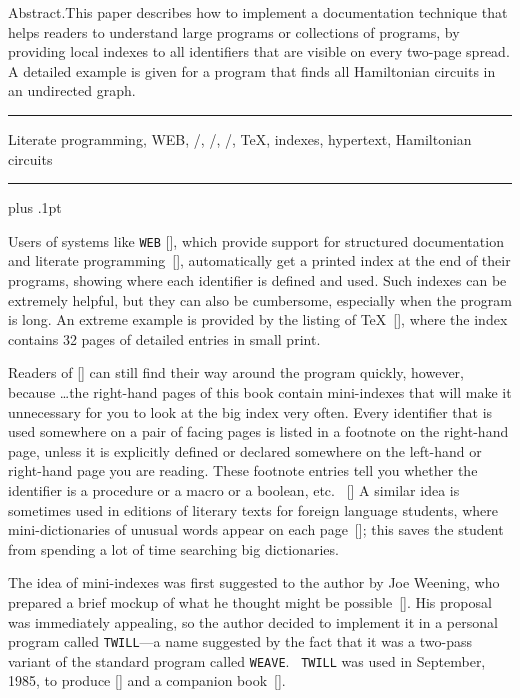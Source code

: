 {\ninerm\baselineskip=11pt\noindent
{\ninebf Abstract.}\enspace This paper describes how to implement
a documentation technique
that helps readers to understand large programs or collections of programs,
by providing local indexes to all identifiers that are visible on
every two-page spread. A detailed example is given for a program that
finds all Hamiltonian circuits in an undirected graph.
\bigskip
\bigskip
\vskip8pt
\hrule
\smallskip
\vskip4pt
\let\tt=\ninett
{}
 Literate programming, {\tt WEB}, \CWEB/, \CPLUSPLUS/,
\CTWILL/, \TeX, indexes, hypertext, Hamiltonian circuits
\smallskip
\vskip4pt
\hrule
\vskip8pt
}
\advance\baselineskip 0pt plus .1pt

Users of systems like {\tt WEB} [\WEB], which provide support for
structured documentation and literate programming~[\LP], automatically get
a printed index at the end of their programs, showing where each identifier
is defined and used. Such indexes can be extremely helpful, but they can also
be cumbersome, especially when the program is long. An extreme example is
provided by the listing of \TeX~[\TTP], where the index contains 32 pages of
detailed entries in small print.

Readers of [\TTP] can still find their way around the program quickly,
however, because
{\smallskip\narrower \noindent
\dots the right-hand pages of this book contain mini-indexes
that will make it unnecessary for you to look at the big index very often.
Every identifier that is used somewhere on a pair of facing pages is listed
in a footnote on the right-hand page, unless it is explicitly defined or
declared somewhere on the left-hand or right-hand page you are reading.
These footnote entries tell you whether the identifier is a procedure or a
macro or a boolean, etc. \ [\TTP]
\smallskip}\noindent
A similar idea is sometimes used in
editions of literary texts for foreign language students, where
mini-dictionaries
of unusual words appear on each page~[\Virg]; this saves the student
from spending a lot of time searching big dictionaries.

The idea of mini-indexes was first suggested to the author by Joe Weening,
who prepared a brief mockup of what he thought might be possible~[\Ween].
His proposal was immediately appealing, so the author decided to implement
it in a personal program called {\tt TWILL}---a name suggested by the fact
that it was a two-pass variant of the standard program called {\tt WEAVE}.
\ {\tt TWILL} was used in September, 1985, to produce [\TTP] and a companion
book~[\MTP].

